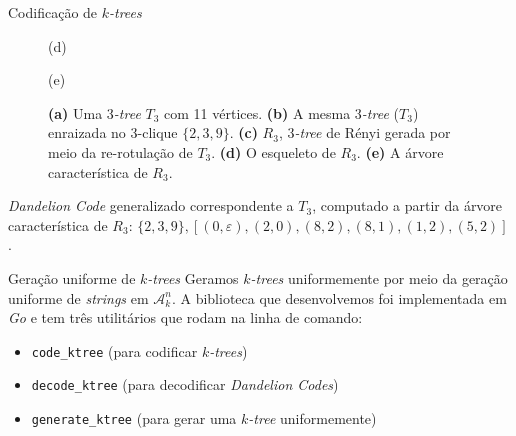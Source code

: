 \documentclass{beamer}
\begin{document}
\begin{frame}
\begin{columns}[t]
\begin{column}{.5\textwidth}
\begin{block}{Codificação de \emph{$k$-trees}}
\begin{figure}
\begin{minipage}{0.5\textwidth}
        (d)
      \end{minipage}\begin{minipage}{0.2\textwidth}
        \centering

        (e)
      \end{minipage}

      \caption{
        \textbf{(a)} Uma \emph{$3$-tree} $T_3$ com 11 vértices.
        \textbf{(b)} A mesma \emph{$3$-tree} ($T_3$) enraizada no $3$-clique $\{2, 3, 9\}$.
        \textbf{(c)} $R_3$, \emph{$3$-tree} de Rényi gerada por meio da re-rotulação de $T_3$.
        \textbf{(d)} O esqueleto de $R_3$.
        \textbf{(e)} A árvore característica de $R_3$.
      }
      \label{fig:transformation}
    \end{figure}

    \emph{Dandelion Code} generalizado correspondente a $T_3$, computado a partir da árvore característica de $R_3$: $\{2,3,9\}, [(0, \varepsilon), (2, 0), (8, 2), (8, 1), (1, 2), (5, 2)]$.
  \end{block}

  \begin{block}{Geração uniforme de \emph{$k$-trees}}
    Geramos \emph{$k$-trees} uniformemente por meio da geração uniforme de \emph{strings} em $\mathcal{A}^n_k$. A biblioteca que desenvolvemos foi implementada em \emph{Go} e tem três utilitários que rodam na linha de comando:

    {\footnotesize
      \begin{itemize}
        \item {\tt code\_ktree} (para codificar \emph{$k$-trees})
        \item {\tt decode\_ktree} (para decodificar \emph{Dandelion Codes})
        \item {\tt generate\_ktree} (para gerar uma \emph{$k$-tree} uniformemente)
      \end{itemize}
    }
  \end{block}
\end{column}


\end{columns}
\end{frame}
\end{document}
